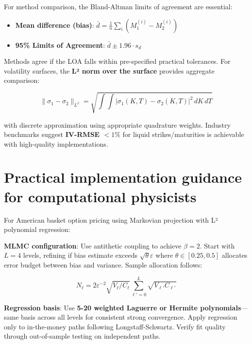 \documentclass[11pt,a4paper]{article}
\begin{document}
\noindent For method comparison, the Bland-Altman limits of agreement are essential:

\begin{itemize}[leftmargin=*,topsep=5pt,itemsep=3pt]
\item \textbf{Mean difference (bias)}: $\bar{d} = \frac{1}{n}\sum_i (M_1^{(i)} - M_2^{(i)})$
\item \textbf{95\% Limits of Agreement}: $\bar{d} \pm 1.96 \cdot s_d$
\end{itemize}

\noindent Methods agree if the LOA falls within pre-specified practical tolerances. For volatility surfaces, the \textbf{L² norm over the surface} provides aggregate comparison:

\begin{equation}
\|\sigma_1 - \sigma_2\|_{L^2} = \sqrt{\int\int |\sigma_1(K,T) - \sigma_2(K,T)|^2 \, dK \, dT}
\end{equation}

\noindent with discrete approximation using appropriate quadrature weights. Industry benchmarks suggest \textbf{IV-RMSE $< 1\%$} for liquid strikes/maturities is achievable with high-quality implementations.

\section{Practical implementation guidance for computational physicists}

For American basket option pricing using Markovian projection with L² polynomial regression:

\vspace{0.2cm}

\noindent \textbf{MLMC configuration}: Use antithetic coupling to achieve $\beta = 2$. Start with $L = 4$ levels, refining if bias estimate exceeds $\sqrt{\theta}\varepsilon$ where $\theta \in [0.25, 0.5]$ allocates error budget between bias and variance. Sample allocation follows:

\begin{equation}
N_\ell = 2\varepsilon^{-2}\sqrt{V_\ell/C_\ell} \sum_{\ell'=0}^{L}\sqrt{V_{\ell'}C_{\ell'}}
\end{equation}

\noindent \textbf{Regression basis}: Use \textbf{5-20 weighted Laguerre or Hermite polynomials}---same basis across all levels for consistent strong convergence. Apply regression only to in-the-money paths following Longstaff-Schwartz. Verify fit quality through out-of-sample testing on independent paths.
\end{document}
